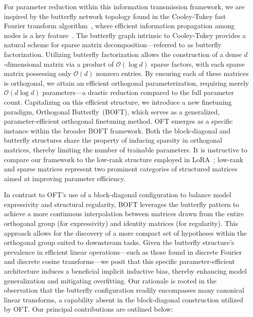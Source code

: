 For parameter reduction within this information transmission framework, we are inspired by the butterfly network topology found in the Cooley-Tukey fast Fourier transform algorithm~\cite{cooley1965algorithm}, where efficient information propagation among nodes is a key feature~\cite{klasing1994broadcasting}. The butterfly graph intrinsic to Cooley-Tukey provides a natural scheme for sparse matrix decomposition—referred to as butterfly factorization. Utilizing butterfly factorization allows the construction of a dense $d$-dimensional matrix via a product of $\mathcal{O}(\log d)$ sparse factors, with each sparse matrix possessing only $\mathcal{O}(d)$ nonzero entries. By ensuring each of these matrices is orthogonal, we attain an efficient orthogonal parameterization, requiring merely $\mathcal{O}(d\log d)$ parameters—a drastic reduction compared to the full parameter count. Capitalizing on this efficient structure, we introduce a new finetuning paradigm, Orthogonal Butterfly~(BOFT), which serves as a generalized, parameter-efficient orthogonal finetuning method. OFT emerges as a specific instance within the broader BOFT framework. Both the block-diagonal and butterfly structures share the property of inducing sparsity in orthogonal matrices, thereby limiting the number of trainable parameters. It is instructive to compare our framework to the low-rank structure employed in LoRA~\cite{hulora2022}; low-rank and sparse matrices represent two prominent categories of structured matrices~\cite{candes2011robust} aimed at improving parameter efficiency.

In contrast to OFT's use of a block-diagonal configuration to balance model expressivity and structural regularity, BOFT leverages the butterfly pattern to achieve a more continuous interpolation between matrices drawn from the entire orthogonal group (for expressivity) and identity matrices (for regularity). This approach allows for the discovery of a more compact set of hypotheses within the orthogonal group suited to downstream tasks. Given the butterfly structure's prevalence in efficient linear operations—such as those found in discrete Fourier and discrete cosine transforms—we posit that this specific parameter-efficient architecture induces a beneficial implicit inductive bias, thereby enhancing model generalization and mitigating overfitting. Our rationale is rooted in the observation that the butterfly configuration readily encompasses many canonical linear transforms, a capability absent in the block-diagonal construction utilized by OFT. Our principal contributions are outlined below:


